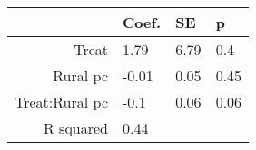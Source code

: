 \begin{tabular}{rlll}
  \hline
 & Coef. & SE & p \\ 
  \hline
Treat & 1.79 & 6.79 & 0.4 \\ 
  Rural pc & -0.01 & 0.05 & 0.45 \\ 
  Treat:Rural pc & -0.1 & 0.06 & 0.06 \\ 
  R squared & 0.44 &  &  \\ 
   \hline
\end{tabular}

